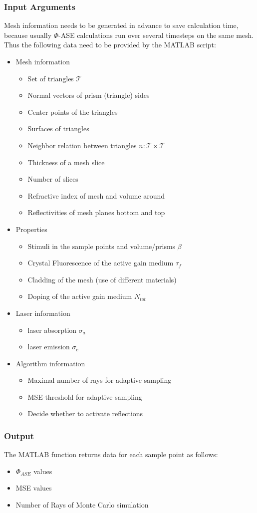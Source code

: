 \subsubsection{Input Arguments}
Mesh information needs to be generated in advance
to save calculation time, because usually $\Phi$-ASE calculations
run over several timesteps on the same mesh. Thus the following
data need to be provided by the MATLAB script:
\begin{itemize}
  \label{label:input}
  \item Mesh information
    \begin{itemize}
    \item Set of triangles $\mathcal{T}$
    \item Normal vectors of prism (triangle) sides
    \item Center points of the triangles
    \item Surfaces of triangles
    \item Neighbor relation between triangles $n : \mathcal{T} \times \mathcal{T}$
    \item Thickness of a mesh slice 
    \item Number of slices
    \item Refractive index of mesh and volume around
    \item Reflectivities of mesh planes bottom and top
    \end{itemize}

  \item Properties 
    \begin{itemize}
      \item Stimuli in the sample points and volume/prisms $\beta$
      \item Crystal Fluorescence of the active gain medium $\tau_{f}$
      \item Cladding of the mesh (use of different materials)
      \item Doping of the active gain medium $N_{tot}$
    \end{itemize}

  \item Laser information
    \begin{itemize}
      \item laser absorption $\sigma_a$
      \item laser emission $\sigma_e$
    \end{itemize}

  \item Algorithm information
    \begin{itemize}
      \item Maximal number of rays for adaptive sampling
      \item MSE-threshold for adaptive sampling
      \item Decide whether to activate reflections
    \end{itemize}
    
\end{itemize}

\subsubsection{Output}
The MATLAB function returns data 
for each sample point as follows:
\begin{itemize}
  \item $\Phi_{ASE}$ values
  \item MSE values
  \item Number of Rays of Monte Carlo simulation
\end{itemize}
